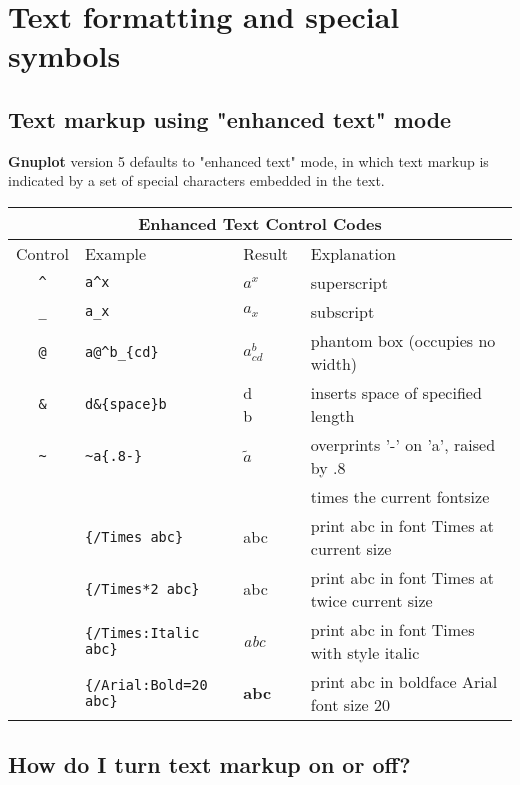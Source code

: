 \documentclass[letter,11pt]{article}
\newcommand{\Gnuplot}{\textbf{Gnuplot }}
\begin{document}
{\section{Text formatting and special symbols}

\subsection{Text markup using "enhanced text" mode}

\Gnuplot version 5 defaults to "enhanced text" mode, in which text markup is
indicated by a set of special characters embedded in the text.

\begin{center}
\begin{tabular}{|clll|} \hline
\multicolumn{4}{|c|}{Enhanced Text Control Codes} \\ \hline
Control & Example & Result & Explanation \\ \hline
\verb~^~ & \verb~a^x~ & $a^x$ & superscript\\
\verb~_~ & \verb~a_x~ & $a_x$ & subscript\\
\verb~@~ & \verb~a@^b_{cd}~ & $a^b_{cd}$ &phantom box (occupies no width)\\
\verb~&~ & \verb~d&{space}b~ & d\verb*+     +b & inserts space of specified length\\
\verb|~| & \verb|~a{.8-}| & $\tilde{a}$ & overprints '-' on 'a', raised by .8\\
\verb~ ~ & \verb~ ~ & ~ ~ & times the current fontsize\\
\verb| | & \verb|{/Times abc}| & {\rm abc} & print abc in font Times at current size\\
\verb| | & \verb|{/Times*2 abc}| & \Large{\rm abc} & print abc in font Times at twice current size\\
\verb| | & \verb|{/Times:Italic abc}| & {\it abc} & print abc in font Times with style italic\\
\verb| | & \verb|{/Arial:Bold=20 abc}| & \Large\textsf{\textbf{abc}} & print abc in boldface Arial font size 20\\
\hline
\end{tabular}
\end{center}

\subsection{How do I turn text markup on or off?}

}
\end{document}
